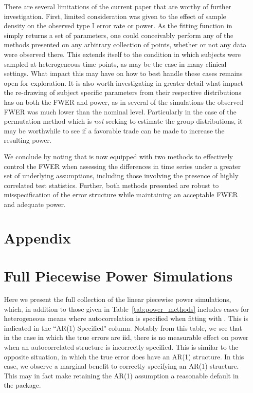 There are several limitations of the current paper that are worthy of further investigation. First, limited consideration was given to the effect of sample density on the observed type I error rate or power. As the fitting function in  simply returns a set of parameters, one could conceivably perform any of the methods presented on any arbitrary collection of points, whether or not any data were observed there. This extends itself to the condition in which subjects were sampled at heterogeneous time points, as may be the case in many clinical settings. What impact this may have on how to best handle these cases remains open for exploration. It is also worth investigating in greater detail what impact the re-drawing of subject specific parameters from their respective distributions has on both the FWER and power, as in several of the simulations the observed FWER was much lower than the nominal level. Particularly in the case of the permutation method which is \textit{not} seeking to estimate the group distributions, it may be worthwhile to see if a favorable trade can be made to increase the resulting power.

We conclude by noting that  is now equipped with two methods to effectively control the FWER when assessing the differences in time series under a greater set of underlying assumptions, including those involving the presence of highly correlated test statistics. Further, both methods presented are robust to misspecification of the error structure while maintaining an acceptable FWER and adequate power. 

\section*{Appendix}

\section{Full Piecewise Power Simulations}

Here we present the full collection of the linear piecewise power simulations, which, in addition to those given in Table~\ref{tab:power_methods} includes cases for heterogeneous means where autocorrelation is specified when fitting with . This is indicated in the ``AR(1) Specified" column. Notably from this table, we see that in the case in which the true errors are iid, there is no measurable effect on power when an autocorrelated structure is incorrectly specified.  This is similar to the opposite situation, in which the true error does have an AR(1) structure. In this case, we observe a marginal benefit to correctly specifying an AR(1) structure. This may in fact make retaining the AR(1) assumption a reasonable default in the  package.


